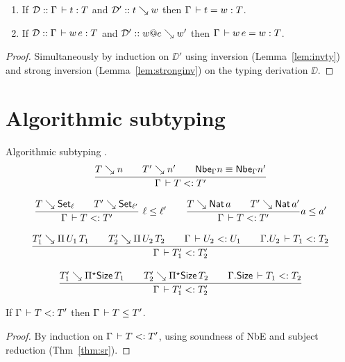 \documentclass[acmlarge,review,anonymous]{acmart}\settopmatter{printfolios=true}
\begin{document}
\begin{theorem}
  \label{thm:sr}
  \bla
  \begin{enumerate}
  \item
  If $\mathcal{D} :: \Gamma \,\vdash t : T$ and $\mathcal{D}' :: t \searrow w$ then $\Gamma \,\vdash t = w : T$.
  \item
  If $\mathcal{D} :: \Gamma \,\vdash w\, e : T$ and $\mathcal{D}' :: w @ e \searrow w'$ then $\Gamma \,\vdash w\,e = w : T$.
  \end{enumerate}
\end{theorem}
\begin{proof}
  Simultaneously by induction on $\DD'$
  using inversion (Lemma~\ref{lem:invty}) and strong inversion (Lemma~\ref{lem:stronginv})
  on the typing derivation $\DD$. %
\end{proof}

\section{Algorithmic subtyping}
\label{sec:asub}

Algorithmic subtyping .
\begin{gather*}
  \ru{T \evalsto n \qquad
      T' \evalsto n' \qquad
      \Nbe \Gamma n \equiv \Nbe \Gamma n'
    }{\Gamma \der T \asub T'}
\\[2ex]
  \rux{T \evalsto \Set[\ell] \qquad
      T' \evalsto \Set[\ell']
    }{\Gamma \der T \asub T'
    }{\ell \leq \ell'}
\qquad
  \ru{T \evalsto \Nat a \qquad
      T' \evalsto \Nat a'
    }{\Gamma \der T \asub T'
    }{a \leq a'}
\\[2ex]
  \ru{T_1' \evalsto \piT{U_1}{T_1} \qquad
      T_2' \evalsto \piT{U_2}{T_2} \qquad
      \Gamma \der U_2 \asub U_1 \qquad
      \cext \Gamma {U_2} \der T_1 \asub T_2
    }{\Gamma \der T_1' \asub T_2'}
\\[2ex]
  \ru{T_1' \evalsto \epiT\Size{T_1} \qquad
      T_2' \evalsto \epiT\Size{T_2} \qquad
      \cext \Gamma {\Size} \der T_1 \asub T_2
    }{\Gamma \der T_1' \asub T_2'}
\end{gather*}

\begin{lemma}
  \label{lem:asubsound}
  If $\Gamma \,\vdash T \mathrel{{<}{:}} T'$ then $\Gamma \,\vdash T \leq T'$.
\end{lemma}
\begin{proof}
  By induction on $\Gamma \,\vdash T \mathrel{{<}{:}} T'$, using soundness of NbE and subject reduction (Thm~\ref{thm:sr}).
\end{proof}
\end{document}
